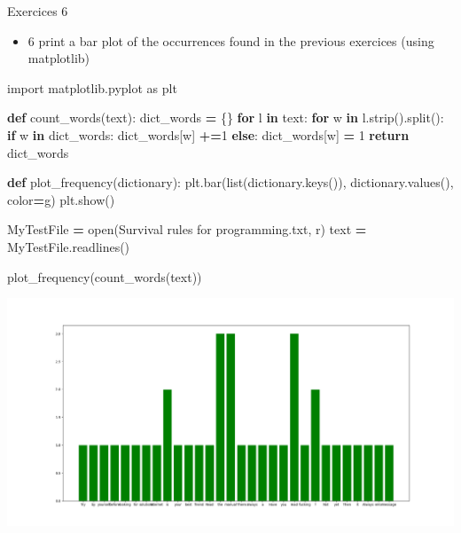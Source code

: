 \documentclass[
  8pt,
  ignorenonframetext,
]{beamer}
\newenvironment{Shaded}{\begin{snugshade}}{\end{snugshade}}
\newcommand{\BuiltInTok}[1]{#1}
\newcommand{\ControlFlowTok}[1]{\textcolor[rgb]{0.13,0.29,0.53}{\textbf{#1}}}
\newcommand{\DecValTok}[1]{\textcolor[rgb]{0.00,0.00,0.81}{#1}}
\newcommand{\ImportTok}[1]{#1}
\newcommand{\KeywordTok}[1]{\textcolor[rgb]{0.13,0.29,0.53}{\textbf{#1}}}
\newcommand{\NormalTok}[1]{#1}
\newcommand{\OperatorTok}[1]{\textcolor[rgb]{0.81,0.36,0.00}{\textbf{#1}}}
\newcommand{\StringTok}[1]{\textcolor[rgb]{0.31,0.60,0.02}{#1}}
\providecommand{\tightlist}{%
  \setlength{\itemsep}{0pt}\setlength{\parskip}{0pt}}
\begin{document}
\begin{frame}[fragile]{Exercices 6}
\protect\hypertarget{exercices-6}{}
\begin{itemize}
\tightlist
\item
  6 print a bar plot of the occurrences found in the previous exercices
  (using matplotlib)
\end{itemize}

\begin{Shaded}
\begin{Highlighting}[]
\ImportTok{import}\NormalTok{ matplotlib.pyplot }\ImportTok{as}\NormalTok{ plt}

\KeywordTok{def}\NormalTok{ count\_words(text):}
\NormalTok{  dict\_words }\OperatorTok{=}\NormalTok{ \{\}}
  \ControlFlowTok{for}\NormalTok{ l }\KeywordTok{in}\NormalTok{ text:}
    \ControlFlowTok{for}\NormalTok{ w }\KeywordTok{in}\NormalTok{ l.strip().split():}
      \ControlFlowTok{if}\NormalTok{ w }\KeywordTok{in}\NormalTok{ dict\_words:}
\NormalTok{        dict\_words[w] }\OperatorTok{+=}\DecValTok{1}
      \ControlFlowTok{else}\NormalTok{:}
\NormalTok{        dict\_words[w] }\OperatorTok{=} \DecValTok{1}
  \ControlFlowTok{return}\NormalTok{ dict\_words}

\KeywordTok{def}\NormalTok{ plot\_frequency(dictionary):}
\NormalTok{  plt.bar(}\BuiltInTok{list}\NormalTok{(dictionary.keys()), dictionary.values(), color}\OperatorTok{=}\StringTok{\textquotesingle{}g\textquotesingle{}}\NormalTok{)}
\NormalTok{  plt.show()}

\NormalTok{MyTestFile }\OperatorTok{=} \BuiltInTok{open}\NormalTok{(}\StringTok{\textquotesingle{}Survival rules for programming.txt\textquotesingle{}}\NormalTok{, }\StringTok{\textquotesingle{}r\textquotesingle{}}\NormalTok{)}
\NormalTok{text }\OperatorTok{=}\NormalTok{ MyTestFile.readlines()}

\NormalTok{plot\_frequency(count\_words(text))}
\end{Highlighting}
\end{Shaded}

\includegraphics{hist.png}
\end{frame}
\end{document}
